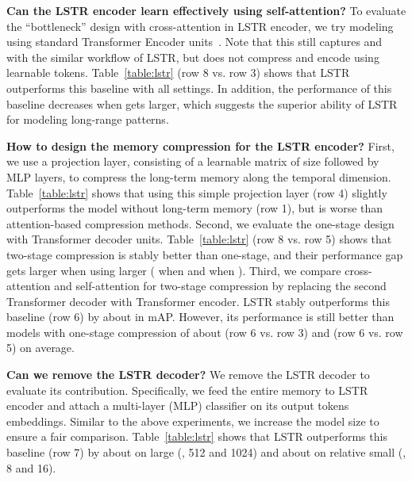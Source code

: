 \textbf{Can the LSTR encoder learn effectively using self-attention?}
To evaluate the ``bottleneck'' design with cross-attention in LSTR encoder,
we try modeling  using standard Transformer Encoder units~\cite{vaswani2017attention}.
Note that this still captures  and  with the similar workflow of LSTR,
but does not compress and encode  using learnable tokens.
Table~\ref{table:lstr} (row 8 vs. row 3) shows that LSTR outperforms this baseline with all  settings.
In addition, the performance of this baseline decreases when  gets larger, which suggests the superior ability of LSTR for modeling long-range patterns.

\textbf{How to design the memory compression for the LSTR encoder?}
First, we use a projection layer, consisting of a learnable matrix of size  followed by MLP layers, to compress the long-term memory along the temporal dimension.
Table~\ref{table:lstr} shows that using this simple projection layer (row 4) slightly outperforms the model without long-term memory (row 1), but is worse than attention-based compression methods.
Second, we evaluate the one-stage design with  Transformer decoder units.
Table~\ref{table:lstr} (row 8 vs. row 5) shows that two-stage compression is stably better than one-stage, and their performance gap gets larger when using larger  ( when  and  when ).
Third, we compare cross-attention and self-attention for two-stage compression
by replacing the second Transformer decoder with Transformer encoder.
LSTR stably outperforms this baseline (row 6) by about  in mAP. However, its performance is still better than models with one-stage compression of about  (row 6 vs. row 3) and  (row 6 vs. row 5) on average.

\textbf{Can we remove the LSTR decoder?}
We remove the LSTR decoder to evaluate its contribution.
Specifically, we feed the entire memory to LSTR encoder and attach a multi-layer (MLP) classifier on its output tokens embeddings.
Similar to the above experiments, we increase the model size to ensure a fair comparison.
Table~\ref{table:lstr} shows that LSTR outperforms this baseline (row 7) by about  on large  (\eg, 512 and 1024) and about  on relative small  (\eg, 8 and 16).


